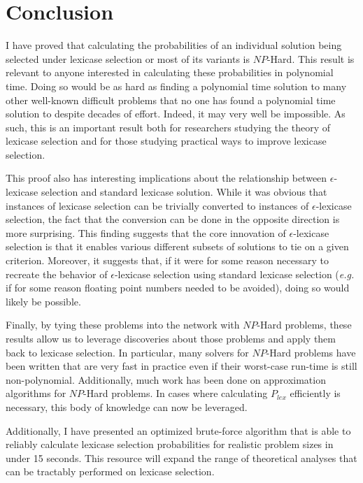\documentclass[sigconf]{acmart}
\begin{document}
\section{Conclusion}

I have proved that calculating the probabilities of an individual solution being selected under lexicase selection or most of its variants is $NP$-Hard. This result is relevant to anyone interested in calculating these probabilities in polynomial time. Doing so would be as hard as finding a polynomial time solution to many other well-known difficult problems that no one has found a polynomial time solution to despite decades of effort. Indeed, it may very well be impossible. As such, this is an important result both for researchers studying the theory of lexicase selection and for those studying practical ways to improve lexicase selection.

This proof also has interesting implications about the relationship between $\epsilon$-lexicase selection and standard lexicase solution. While it was obvious that instances of lexicase selection can be trivially converted to instances of $\epsilon$-lexicase selection, the fact that the conversion can be done in the opposite direction is more surprising. This finding suggests that the core innovation of  $\epsilon$-lexicase selection is that it enables various different subsets of solutions to tie on a given criterion. Moreover, it suggests that, if it were for some reason necessary to recreate the behavior of $\epsilon$-lexicase selection using standard lexicase selection (\textit{e.g.} if for some reason floating point numbers needed to be avoided), doing so would likely be possible.

Finally, by tying these problems into the network with $NP$-Hard problems, these results allow us to leverage discoveries about those problems and apply them back to lexicase selection. In particular, many solvers for $NP$-Hard problems have been written that are very fast in practice even if their worst-case run-time is still non-polynomial. Additionally, much work has been done on approximation algorithms for $NP$-Hard problems. In cases where calculating $P_{lex}$ efficiently is necessary, this body of knowledge can now be leveraged.

Additionally, I have presented an optimized brute-force algorithm that is able to reliably calculate lexicase selection probabilities for realistic problem sizes in under 15 seconds. This resource will expand the range of theoretical analyses that can be tractably performed on lexicase selection.
\end{document}
